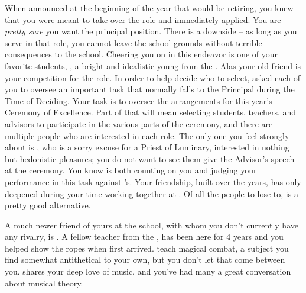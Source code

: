 \documentclass[char]{GL2020}
\begin{document}
When \cPrincipal{} announced at the beginning of the year that \cPrincipal{\they} would be retiring, you knew that you were meant to take over the role and immediately applied. You are \emph{pretty sure} you want the principal position. There is a downside -- as long as you serve in that role, you cannot leave the school grounds without terrible consequences to the school. Cheering you on in this endeavor is one of your favorite students, \cDisney{\full}, a bright and idealistic young \cDisney{\person} from the \pFarm{}. Alas your old friend \cBeetle{} is your competition for the role. In order to help \cPrincipal{} decide who to select, \cPrincipal{\they} \cPrincipal{\have} asked each of you to oversee an important task that normally falls to the Principal during the Time of Deciding. Your task is to oversee the arrangements for this year's Ceremony of Excellence. Part of that will mean selecting students, teachers, and advisors to participate in the various parts of the ceremony, and there are multiple people who are interested in each role. The only one you feel strongly about is \cHedonist{}, who is a sorry excuse for a Priest of Luminary, interested in nothing but hedonistic pleasures; you do not want to see them give the Advisor’s speech at the ceremony. You know \cPrincipal{} is both counting on you and judging your performance in this task against \cBeetle{}'s. Your friendship, built over the years, has only deepened during your time working together at \pSchool{}. Of all the people to lose to, \cBeetle{} is a pretty good alternative. 

A much newer friend of yours at the school, with whom you don't currently have any rivalry, is \cInterpol{\full}. A fellow teacher from the \pFarm{}, \cInterpol{} has been here for 4 years and you helped show \cInterpol{\them} the ropes when \cInterpol{\they} first arrived. \cInterpol{\They} teach\cInterpol{\pluralC} magical combat, a subject you find somewhat antithetical to your own, but you don't let that come between you. \cInterpol{} shares your deep love of music, and you've had many a great conversation about musical theory.
\end{document}

